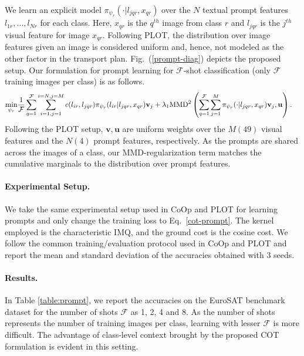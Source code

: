 We learn an explicit model $\pi_{\psi_r}(\cdot|l_{jqr},x_{qr})$ over the $N$ textual prompt features $l_{1r},\ldots,l_{Nr}$ for each class. Here, $x_{qr}$ is the $q^{th}$ image from class $r$ and $l_{jqr}$ is the $j^{th}$ visual feature for image $x_{qr}$. Following PLOT, the distribution over image features given an image is considered uniform and, hence, not modeled as the other factor in the transport plan. Fig.~(\ref{prompt-diag}) depicts the proposed setup. Our formulation for prompt learning for $\mathcal{F}$-shot classification (only $\mathcal{F}$ training images per class) is as follows.
\begin{align}
\min\limits_{\psi_r}&\frac{1}{\mathcal{F}}\sum_{q=1}^{\mathcal{F}}\sum_{i=1,j=1}^{i=N,j=M} c(l_{ir},l_{jqr})\pi_{\psi_r}(l_{ir}|l_{jqr},x_{qr}) \mathbf{v}_j+\lambda_1\textup{MMD}^2\left(\sum_{q=1}^{\mathcal{F}} \sum_{j=1}^{M}\pi_{\psi_r}(\cdot|l_{jqr},x_{qr})\mathbf{v}_j, \mathbf{u}\right).\label{cot-prompt}
 \end{align}
Following the PLOT setup, $\mathbf{v}, \mathbf{u}$ are uniform weights over the $M(49)$ visual features and the $N(4)$ prompt features, respectively. As the prompts are shared across the images of a class, our MMD-regularization term matches the cumulative marginals to the distribution over prompt features.
\paragraph{Experimental Setup.}
We take the same experimental setup used in CoOp \citep{coop} and PLOT \citep{chen2023plot} for learning prompts and only change the training loss to Eq.~\ref{cot-prompt}. The kernel employed is the characteristic IMQ, and the ground cost is the cosine cost. We follow the common training/evaluation protocol used in CoOp and PLOT and report the mean and standard deviation of the accuracies obtained with 3 seeds.

\paragraph{Results.} In Table \ref{table:prompt}, we report the accuracies on the EuroSAT benchmark dataset \citep{helber2019eurosat} for the number of shots $\mathcal{F}$ as 1, 2, 4 and 8. As the number of shots represents the number of training images per class, learning with lesser $\mathcal{F}$ is more difficult. The advantage of class-level context brought by the proposed COT formulation is evident in this setting. 


